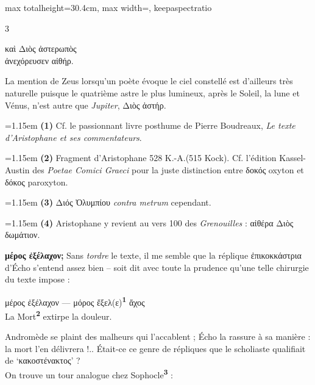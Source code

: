 \documentclass[11pt,twoside]{book}
\newcommand{\italique}[1]{\textit{#1}}
\newcommand{\citComm}[1]{\begin{quoting}[vskip=0.4pt,leftmargin=0.7em,rightmargin=0.2em]#1\end{quoting}}
\newcommand{\marqueur}[1]{\textsuperscript{\color{rubricRed}\textbf{#1}}}
\begin{document}
\begin{adjustbox}{max totalheight=30.4cm, max width=\textwidth, keepaspectratio}
\begin{minipage}{\textwidth}
{\begin{multicols}{3}
\citComm{καὶ Διὸς ἀστερωπὸς\\
ἀνεχόρευσεν αἰθήρ.}
\par\vspace{1.5pt}
\noindent La mention de Zeus lorsqu'un poète évoque le ciel constellé est d'ailleurs très naturelle puisque le quatrième astre le plus lumineux, après le Soleil, la lune et Vénus, n'est autre que \italique{Jupiter}, Διὸς ἀστήρ.
\par\vspace{1.5pt}
\par\vspace{1.2pt}\par\nopagebreak\vspace{1pt}\noindent\hangindent=1.15em {\color{sepiaNote}\textbf{(1)}} Cf. le passionnant livre posthume de Pierre Boudreaux, \italique{Le texte d'Aristophane et ses commentateurs}.
\par\vspace{1.5pt}
\noindent\hangindent=1.15em {\color{sepiaNote}\textbf{(2)}} Fragment d'Aristophane 528 K.-A.(515 Kock). Cf. l'édition Kassel-Austin des \italique{Poetae Comici Graeci} pour la juste distinction entre δοκός oxyton et δόκος paroxyton.
\par\vspace{1.5pt}
\noindent\hangindent=1.15em {\color{sepiaNote}\textbf{(3)}} Διός Ὀλυμπίου \italique{contra metrum} cependant.
\par\vspace{1.5pt}
\noindent\hangindent=1.15em {\color{sepiaNote}\textbf{(4)}} Aristophane y revient au vers 100 des \italique{Grenouilles} : αἰθέρα Διὸς δωμάτιον.
\par\vspace{1.5pt}
 \textbf{μέρος ἐξέλαχον;} Sans \italique{tordre} le texte, il me semble que la réplique ἐπικοκκάστρια d'Écho s'entend assez bien -- soit dit avec toute la prudence qu'une telle chirurgie du texte impose :
\citComm{μέρος ἐξέλαχον --- μόρος ἔξελ(ε)\marqueur{1} ἄχος\\
La Mort\marqueur{2} extirpe la douleur.}
\par\vspace{1.5pt}
\noindent Andromède se plaint des malheurs qui l'accablent ; Écho la rassure à sa manière : la mort l'en délivrera !.. Était-ce ce genre de répliques que le scholiaste qualifiait de `κακοστένακτος' ?\\ On trouve un tour analogue chez Sophocle\marqueur{3} :

\end{multicols}}
\end{minipage}
\end{adjustbox}
\end{document}
